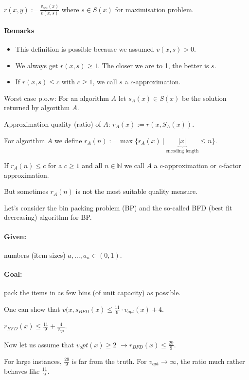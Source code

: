 \documentclass[11pt]{article}
\theoremstyle{definition}
\theoremstyle{definition}
\begin{document}
$ r(x, y) :=\frac{v_{opt} (x)}{v(x, s)} $ where $ s \in S(x) $ for maximisation problem.

\paragraph{Remarks}
\begin{itemize}
\item This definition is possible because we assumed $ v(x, s) > 0 $.
\item We always get $ r(x, s) \geq 1 $. The closer we are to 1, the better is $ s $.
\item If $ r(x, s) \leq c $ with $ c \geq 1 $, we call $ s $ a $ c $-approximation.
\end{itemize}

Worst case p.o.w: For an algorithm $ A $ let $ s_A(x) \in S(x) $ be the solution returned by algorithm $ A $.

Approximation quality (ratio) of $ A $: $ r_A(x) := r(x, S_A(x)) $.

For algorithm $ A $ we define $ r_A(n) := \max\{ r_A(x) ~|~ \underbrace{|x|}_{\text{encoding length}} \leq n\} $.

If $ r_A(n) \leq c $ for a $ c \geq 1 $ and all $ n \in \mathbb{N} $ we call $ A $ a $ c $-approximation or $ c $-factor approximation.

But sometimes $ r_A(n) $ is not the most suitable quality measure.

Let's consider the bin packing problem (BP) and the so-called BFD (best fit decreasing) algorithm for BP.

\paragraph{Given:}  numbers (item sizes) $ a, \dots, a_n \in (0, 1) $.
\paragraph{Goal:} pack the items in as few bins (of unit capacity) as possible.

One can show that $ v(x, s_{BFD} (x) \leq \frac{11}{9} \cdot v_{opt} (x) + 4 $.

$ r_{BFD} (x) \leq \frac{11}{9} + \frac{4}{v_{opt}} $.

Now let us assume that
$ v_opt(x) \geq 2 $ $ \rightarrow r_{BFD} (x) \leq \frac{29}{9} $.

For large instances, $ \frac{29}{9} $ is far from the truth. For $ v_{opt} \rightarrow \infty $, the ratio much rather behaves like $ \frac{11}{9} $.
\end{document}
